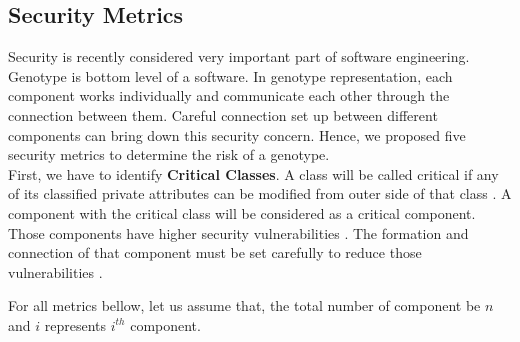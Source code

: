 \documentclass[letterpaper, 10 pt, conference]{ieeeconf}  %
\begin{document}
\subsection{Security Metrics}
Security is recently considered very important part of  software engineering. Genotype is bottom level of a software. In genotype representation, each component works individually and  communicate each other through the connection between them. 
Careful connection set up between different components can bring down this security concern. Hence, we proposed five security metrics to determine the risk of a genotype. \\ 
First, we have to identify \textbf{Critical Classes}. A class will be called critical if any of its classified private attributes can be modified from outer side of that class \cite{alshammari2010security}. A component with the critical class will be considered as a critical component. Those components have higher security  vulnerabilities . The formation and connection of that component must be set carefully to reduce those  vulnerabilities .

For all metrics bellow, let us assume that, the total number of component be $n$ and $i$ represents $i^{th}$ component.
\end{document}
